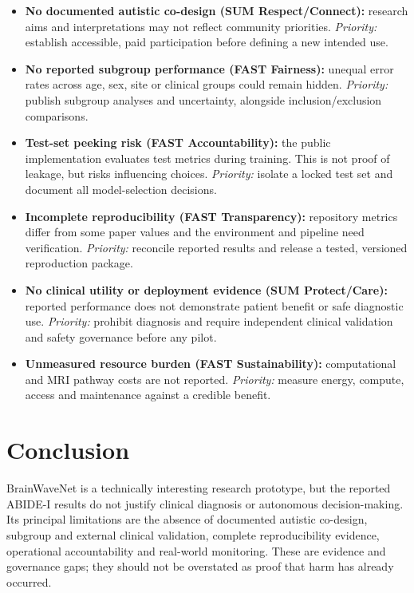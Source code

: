 \documentclass[11pt,a4paper]{article}
\begin{document}
\begin{itemize}
\item \textbf{No documented autistic co-design (SUM Respect/Connect):} research aims and interpretations may not reflect community priorities. \textit{Priority:} establish accessible, paid participation before defining a new intended use.
\item \textbf{No reported subgroup performance (FAST Fairness):} unequal error rates across age, sex, site or clinical groups could remain hidden. \textit{Priority:} publish subgroup analyses and uncertainty, alongside inclusion/exclusion comparisons.
\item \textbf{Test-set peeking risk (FAST Accountability):} the public implementation evaluates test metrics during training. This is not proof of leakage, but risks influencing choices. \textit{Priority:} isolate a locked test set and document all model-selection decisions.
\item \textbf{Incomplete reproducibility (FAST Transparency):} repository metrics differ from some paper values and the environment and pipeline need verification. \textit{Priority:} reconcile reported results and release a tested, versioned reproduction package.
\item \textbf{No clinical utility or deployment evidence (SUM Protect/Care):} reported performance does not demonstrate patient benefit or safe diagnostic use. \textit{Priority:} prohibit diagnosis and require independent clinical validation and safety governance before any pilot.
\item \textbf{Unmeasured resource burden (FAST Sustainability):} computational and MRI pathway costs are not reported. \textit{Priority:} measure energy, compute, access and maintenance against a credible benefit.
\end{itemize}

\section{Conclusion}
BrainWaveNet is a technically interesting research prototype, but the reported ABIDE-I results do not justify clinical diagnosis or autonomous decision-making. Its principal limitations are the absence of documented autistic co-design, subgroup and external clinical validation, complete reproducibility evidence, operational accountability and real-world monitoring. These are evidence and governance gaps; they should not be overstated as proof that harm has already occurred.
\end{document}
